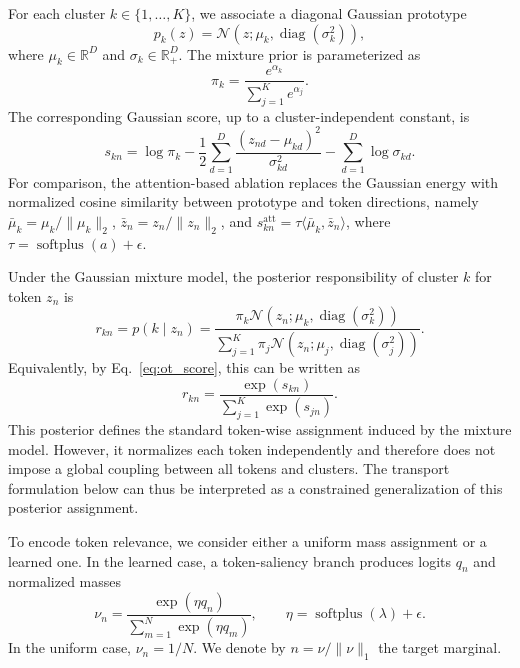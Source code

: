 \documentclass[journal]{IEEEtran}
\begin{document}
For each cluster \(k \in \{1,\dots,K\}\), we associate a diagonal Gaussian prototype
\[
p_k(z) = \mathcal{N}(z; \mu_k, \operatorname{diag}(\sigma_k^2)),
\]
where \(\mu_k \in \mathbb{R}^D\) and \(\sigma_k \in \mathbb{R}_+^D\). The mixture prior is parameterized as
\[
\pi_k = \frac{e^{\alpha_k}}{\sum_{j=1}^K e^{\alpha_j}}.
\]
The corresponding Gaussian score, up to a cluster-independent constant, is
\begin{equation}
s_{kn}
= \log \pi_k
-\frac{1}{2}\sum_{d=1}^D \frac{(z_{nd}-\mu_{kd})^2}{\sigma_{kd}^2}
-\sum_{d=1}^D \log \sigma_{kd}.
\label{eq:ot_score}
\end{equation}
For comparison, the attention-based ablation replaces the Gaussian energy with normalized cosine similarity between prototype and token directions, namely \(\bar{\mu}_k = \mu_k / \|\mu_k\|_2\), \(\bar{z}_n = z_n / \|z_n\|_2\), and \(s^{\mathrm{att}}_{kn} = \tau \langle \bar{\mu}_k, \bar{z}_n \rangle\), where \(\tau = \operatorname{softplus}(a) + \epsilon\).

Under the Gaussian mixture model, the posterior responsibility of cluster \(k\) for token \(z_n\) is
\[
r_{kn} = p(k \mid z_n)
= \frac{\pi_k \mathcal{N}(z_n; \mu_k, \operatorname{diag}(\sigma_k^2))}{\sum_{j=1}^K \pi_j \mathcal{N}(z_n; \mu_j, \operatorname{diag}(\sigma_j^2))}.
\]
Equivalently, by Eq.~\eqref{eq:ot_score}, this can be written as
\[
r_{kn} = \frac{\exp(s_{kn})}{\sum_{j=1}^K \exp(s_{jn})}.
\]
This posterior defines the standard token-wise assignment induced by the mixture model. However, it normalizes each token independently and therefore does not impose a global coupling between all tokens and clusters. The transport formulation below can thus be interpreted as a constrained generalization of this posterior assignment.

To encode token relevance, we consider either a uniform mass assignment or a learned one. In the learned case, a token-saliency branch produces logits \(q_n\) and normalized masses
\[
\nu_n = \frac{\exp(\eta q_n)}{\sum_{m=1}^N \exp(\eta q_m)},
\qquad \eta = \operatorname{softplus}(\lambda) + \epsilon.
\]
In the uniform case, \(\nu_n = 1/N\). We denote by \(n = \nu / \|\nu\|_1\) the target marginal.
\end{document}
